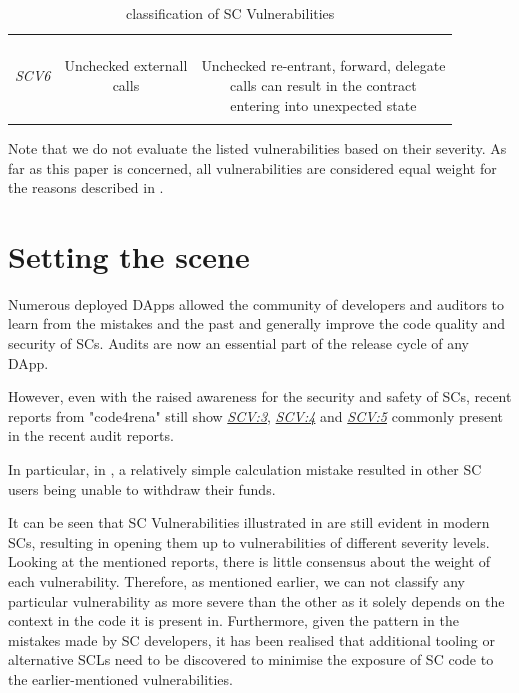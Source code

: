 \documentclass[oneside]{ecsproject}     %
\newcommand{\vref}[1]{\textit{\hyperref[#1]{#1}}}
\begin{document}
\begin{table}[!htb]
\begin{tabular}{ccc}
  \hline
  \textit{SCV6}\label{SCV:6} & \makecell{Unchecked externall\\calls} & \makecell{\\Unchecked re-entrant, forward, delegate\\calls can result in the contract\\entering into unexpected state}\\\\
  \bottomrule
  \end{tabular}
  \caption{classification of SC Vulnerabilities}
  \label{Table:classification}
\end{table}

Note that we do not evaluate the listed vulnerabilities based on their severity. 
As far as this paper is concerned, all vulnerabilities are considered equal weight for the reasons described in .

\section{Setting the scene} \label{Section:Scene}

Numerous deployed DApps allowed the community of developers and auditors to learn from the mistakes and the past
and generally improve the code quality and security of SCs. Audits are now an essential part of the release cycle of any DApp.

However, even with the raised awareness for the security and safety of SCs, recent reports from "code4rena" still show \vref{SCV:3}, \vref{SCV:4} and \vref{SCV:5}
commonly present in the recent audit reports\cite{arcade_report}\cite{ondo_report}\cite{centrifuge_report}.

In particular, in \cite{centrifuge_report}, a relatively simple calculation mistake resulted in other SC users being unable to withdraw their funds.

It can be seen that SC Vulnerabilities illustrated in  are still evident in modern SCs, resulting in opening them up to vulnerabilities of different severity levels.
Looking at the mentioned reports, there is little consensus about the weight of each vulnerability.
Therefore, as mentioned earlier, we can not classify any particular vulnerability as more severe than the other as it solely depends on the context in the code it is present in.
Furthermore, given the pattern in the mistakes made by SC developers, 
it has been realised that additional tooling or alternative SCLs need to be discovered to minimise the exposure of SC code to the earlier-mentioned vulnerabilities.
\end{document}
